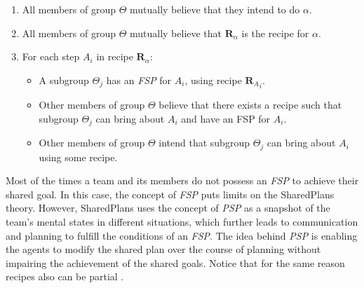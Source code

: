\documentclass[12pt]{report}
\begin{document}
\begin{enumerate}
  \item All members of group $\Theta$ mutually believe that they intend to do
  $\alpha$.
  \item All members of group $\Theta$ mutually believe that
  \textit{$\textbf{R}_\alpha$} is the recipe for $\alpha$.
  \item For each step \textit{$A_i$} in recipe \textit{$\textbf{R}_\alpha$}:
  \begin{itemize}
    \item A subgroup $\Theta_j$ has an \textit{FSP} for \textit{$A_i$}, using
    recipe \textit{${\textbf{R}_A}_i$}.
    \item Other members of group $\Theta$ believe that there exists a recipe
    such that subgroup $\Theta_j$ can bring about \textit{$A_i$} and have an FSP
    for \textit{$A_i$}.
    \item Other members of group $\Theta$ intend that subgroup $\Theta_j$ can
    bring about \textit{$A_i$} using some recipe.
  \end{itemize}
\end{enumerate}

Most of the times a team and its members do not possess an \textit{FSP} to
achieve their shared goal. In this case, the concept of \textit{FSP} puts limits
on the SharedPlans theory. However, SharedPlans uses the concept of \textit{PSP}
as a snapshot of the team's mental states in different situations, which further
leads to communication and planning to fulfill the conditions of an
\textit{FSP}. The idea behind \textit{PSP} is enabling the agents to modify the
shared plan over the course of planning without impairing the achievement of the
shared goals. Notice that for the same reason recipes also can be partial
\cite{grosz:collaboration, grosz:plans-discourse}.
\end{document}

